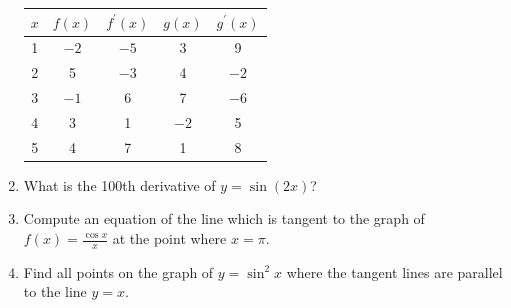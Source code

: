 \documentclass[12pt]{article}
\newif\ifans
\begin{document}
\begin{enumerate}
\begin{center}
\begin{tabular}{c|c|c|c|c}
$x$ & $f(x)$ & $f^{\prime}(x)$ & $g(x)$ & $g^{\prime}(x)$\\
\hline
1 & $-2$ & $-5$ & 3 & 9\\
2& 5 & $-3$ & 4 & $-2$\\
3 & $-1$ & 6  & 7 & $-6$\\
4 & 3 & 1 & $-2$ & 5\\
5 & 4 & 7 & 1 & 8
\end{tabular}
\end{center}

\ifans{\fbox{$-\frac{9\pi}{4}$}} \fi

\item What is the 100th derivative of $y=\sin{(2x)}$?

\ifans{\fbox{$2^{100}\sin{2x}$}} \fi

\item Compute an equation of the line which is tangent to the graph of $f(x)=\frac{\cos{x}}{x}$ at the point where $x=\pi$.

\ifans{\fbox{$y=\frac{1}{\pi^2}x-\frac{2}{\pi}$}} \fi

\item Find all points on the graph of $y=\sin^2{x}$ where the tangent lines are parallel to the line $y=x$.

\ifans{\fbox{$\frac{\pi}{4}+\pi k$ where $k$ is any integer}} \fi

\end{enumerate}

\newpage

\end{document}
